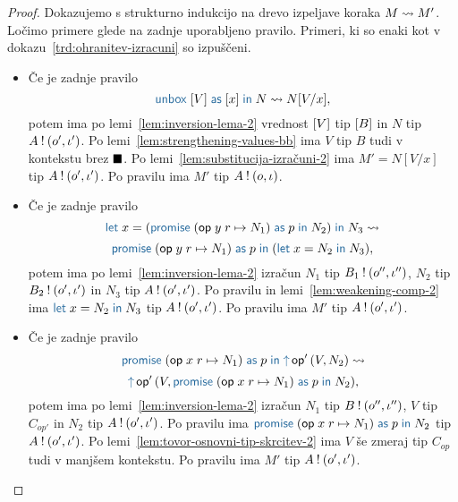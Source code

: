 \begin{proof}
	Dokazujemo s strukturno indukcijo na drevo izpeljave koraka $M \leadsto M'$.
	Ločimo primere glede na zadnje uporabljeno pravilo.
	Primeri, ki so enaki kot v dokazu~\ref{trd:ohranitev-izracuni} so izpuščeni.

	\begin{itemize}
		\item Če je zadnje pravilo $$\tmunbox{[V]}{x}{N} \reduces N[V/x],$$ potem ima po lemi~\ref{lem:inversion-lema-2} vrednost $[V]$ tip $[B]$ in $N$ tip $A \mathbin{!} (o', \iota')$.
		Po lemi~\ref{lem:strengthening-values-bb} ima $V$ tip $B$ tudi v kontekstu brez $\blacksquare$.
		Po lemi~\ref{lem:substitucija-izračuni-2} ima $M' = N[V/x]$ tip $A \mathbin{!} (o', \iota')$.
		Po pravilu  ima $M'$ tip $A \mathbin{!} (o, \iota)$.
		
		\item Če je zadnje pravilo $$\tmlet{x}{(\tmwithrec{op}{y}{r}{N_1}{p}{N_2})}{N_3} \reduces $$ $$ \tmwithrec{op}{y}{r}{N_1}{p}{(\tmlet{x}{N_2}{N_3})},$$ potem ima po lemi~\ref{lem:inversion-lema-2} izračun $N_1$ tip $B_1 \mathbin{!} (o'', \iota'')$, $N_2$ tip $B_2 \mathbin{!} (o', \iota')$ in $N_3$ tip $A \mathbin{!} (o', \iota')$.
		Po pravilu  in lemi~\ref{lem:weakening-comp-2} ima $\tmlet{x}{N_2}{N_3}$ tip $A \mathbin{!} (o', \iota')$.
		Po pravilu  ima $M'$ tip $A \mathbin{!} (o', \iota')$.
		
		\item Če je zadnje pravilo $$\tmwithrec{op}{x}{r}{N_1}{p}{\tmopout{op'}{V}{N_2}} \reduces $$ $$\tmopout{op'}{V}{\tmwithrec{op}{x}{r}{N_1}{p}{N_2}},$$ potem ima po lemi~\ref{lem:inversion-lema-2} izračun $N_1$ tip $B \mathbin{!} (o'', \iota'')$, $V$ tip $C_{op'}$ in $N_2$ tip $A \mathbin{!} (o', \iota')$.
		Po pravilu  ima $\tmwithrec{op}{x}{r}{N_1}{p}{N_2}$ tip $A \mathbin{!} (o', \iota')$.
		Po lemi~\ref{lem:tovor-osnovni-tip-skrcitev-2} ima $V$ še zmeraj tip $C_{op}$ tudi v manjšem kontekstu.
		Po pravilu  ima $M'$ tip $A \mathbin{!} (o', \iota')$.
		

\end{itemize}
\end{proof}
